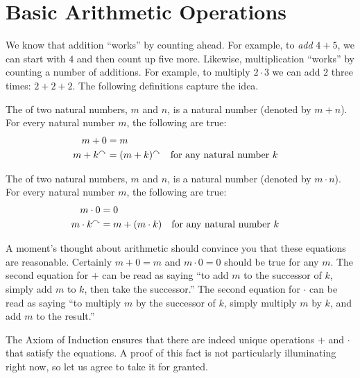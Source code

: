 \ipadbreak
\printbreak

\section{Basic Arithmetic Operations}

We know that addition ``works'' by counting ahead. For example, to \emph{add} $4+5$, we can start with $4$ and then count up five more. Likewise, multiplication ``works'' by counting a number of additions. For example, to multiply $2\cdot 3$ we can add $2$ three times: $2+2+2$. The following definitions capture the idea.
 
\begin{defn}\label{def:NatArithmetic}
\noindent The  of two natural numbers, $m$ and $n$, is a natural number (denoted by $m+n$). For every natural number $m$, the following 
are true:
\begin{align*}
    m + 0     &= m\\
    m + k^\curvearrowright &= (m + k)^\curvearrowright &&\text{for any natural number $k$}
\end{align*}

\noindent The  of two natural numbers, $m$ and $n$, is a natural number 
(denoted by $m\cdot n$). For every natural number $m$, the following are true:
\begin{align*}
  m\cdot 0 &= 0\\
  m\cdot k^\curvearrowright &= m + (m\cdot k) &&\text{for any natural number $k$}
\end{align*}
\end{defn}


A moment's thought about arithmetic should convince you that these equations are reasonable.
Certainly $m+0=m$ and $m\cdot 0 = 0$ should be true for any $m$. 
The second equation for $+$ can be read as saying ``to add $m$ to the successor of $k$, simply add $m$ to $k$, then take the successor.''
The second equation for $\cdot$ can be read as saying ``to multiply $m$ by the successor of $k$, simply multiply $m$ by $k$, and add $m$ to the result.''

The Axiom of Induction ensures that there are indeed unique operations $+$ and $\cdot$ that satisfy the equations.
A proof of this fact is not particularly illuminating right now, so let us agree to take it for granted.

